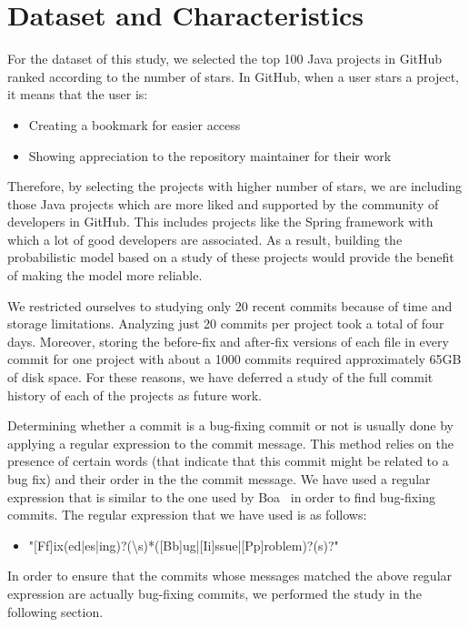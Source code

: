 
\section{Dataset and Characteristics}
For the dataset of this study, we selected the top 100 Java projects in GitHub ranked according to the number of stars. In GitHub, when a user stars a project, it means that the user is:
\begin{itemize}
  \item Creating a bookmark for easier access
  \item Showing appreciation to the repository maintainer for their work
\end{itemize}

Therefore, by selecting the projects with higher number of stars, we are including those Java projects which are more liked and supported by the community of developers in GitHub. This includes projects like the Spring framework with which a lot of good developers are associated. As a result, building the probabilistic model based on a study of these projects would provide the benefit of making the model more reliable.

We restricted ourselves to studying only 20 recent commits because of time and storage limitations. Analyzing just 20 commits per project took a total of four days. Moreover, storing the before-fix and after-fix versions of each file in every commit for one project with about a 1000 commits required approximately 65GB of disk space. For these reasons, we have deferred a study of the full commit history of each of the projects as future work.

Determining whether a commit is a bug-fixing commit or not is usually done by applying a regular expression to the commit message. This method relies on the presence of certain words (that indicate that this commit might be related to a bug fix) and their order in the the commit message. We have used a regular expression that is similar to the one used by Boa~\cite{Dyer2013} in order to find bug-fixing commits. The regular expression that we have used is as follows:
\begin{itemize}
  \item "[Ff]ix(ed|es|ing)?(\textbackslash s)*([Bb]ug|[Ii]ssue|[Pp]roblem)?(s)?"
\end{itemize}

In order to ensure that the commits whose messages matched the above regular expression are actually bug-fixing commits, we performed the study in the following section.


